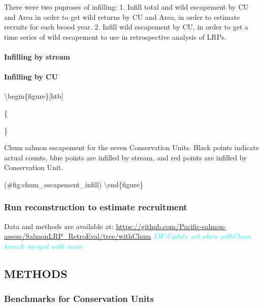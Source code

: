 \documentclass[11pt]{book}
\begin{document}
There were two puproses of infilling: 1. Infill total and wild escapement by CU and Area in order to get wild returns by CU and Area, in order to estimate recruits for each brood year. 2. Infill wild escapement by CU, in order to get a time series of wild escapement to use in retrospective analysis of LRPs.

\hypertarget{infilling-by-stream}{%
\paragraph{Infilling by stream}\label{infilling-by-stream}}

\hypertarget{infilling-by-cu}{%
\paragraph{Infilling by CU}\label{infilling-by-cu}}

\textbackslash begin\{figure\}{[}htb{]}

\{\centering {}

\}

\caption{Chum salmon escapement for the seven Conservation Units. Black points indicate actual counts, blue points are infilled by stream, and red points are infilled by Conservation Unit.}

(\#fig:chum\_escapement\_infill) \textbackslash end\{figure\}

\hypertarget{run-reconstruction-to-estimate-recruitment}{%
\subsubsection{Run reconstruction to estimate recruitment}\label{run-reconstruction-to-estimate-recruitment}}

Data and methods are available at: \url{https://github.com/Pacific-salmon-assess/SalmonLRP_RetroEval/tree/withChum} \emph{\textcolor{cyan}{LW:Update url when withChum branch merged with main}}

\hypertarget{methods-2}{%
\subsection{METHODS}\label{methods-2}}

\hypertarget{benchmarks-for-conservation-units}{%
\subsubsection{Benchmarks for Conservation Units}\label{benchmarks-for-conservation-units}}
\end{document}

